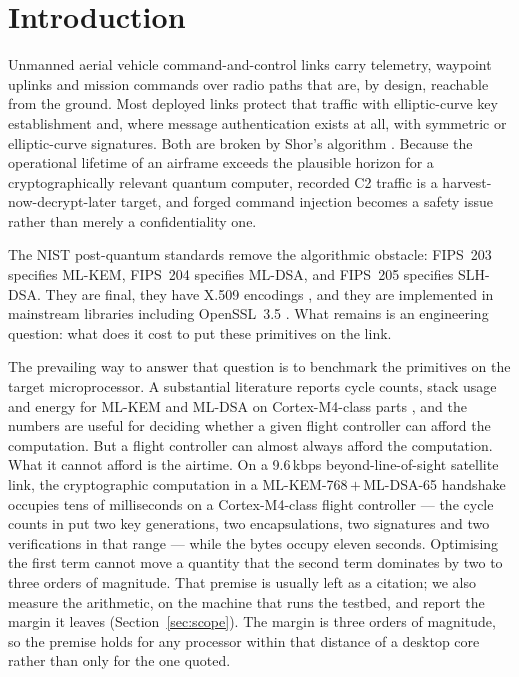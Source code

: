 \documentclass[drones,article,submit,pdftex,moreauthors]{Definitions/mdpi}
\newcommand{\kbps}{kbps}
\newcommand{\mlkem}{ML-KEM}
\newcommand{\mldsa}{ML-DSA}
\newcommand{\slhdsa}{SLH-DSA}
\begin{document}
\section{Introduction}

Unmanned aerial vehicle command-and-control links carry telemetry,
waypoint uplinks and mission commands over radio paths that are, by
design, reachable from the ground. Most deployed links protect that
traffic with elliptic-curve key establishment and, where message
authentication exists at all, with symmetric or elliptic-curve
signatures. Both are broken by Shor's algorithm \cite{shor1997}. Because
the operational lifetime of an airframe exceeds the plausible horizon
for a cryptographically relevant quantum computer, recorded C2 traffic
is a harvest-now-decrypt-later target, and forged command injection
becomes a safety issue rather than merely a confidentiality one.

The NIST post-quantum standards remove the algorithmic obstacle:
FIPS~203 \cite{fips203} specifies \mlkem{}, FIPS~204 \cite{fips204}
specifies \mldsa{}, and FIPS~205 \cite{fips205} specifies \slhdsa{}.
They are final, they have X.509 encodings \cite{rfc9881,rfc9909}, and
they are implemented in mainstream libraries including OpenSSL~3.5
\cite{openssl35}. What remains is an engineering question: what does it
cost to put these primitives on the link.

The prevailing way to answer that question is to benchmark the
primitives on the target microprocessor. A substantial literature
reports cycle counts, stack usage and energy for \mlkem{} and \mldsa{}
on Cortex-M4-class parts \cite{pqm4,botros2019}, and the numbers are
useful for deciding whether a given flight controller can afford the
computation. But a flight controller can almost always afford the
computation. What it cannot afford is the airtime. On a 9.6\,\kbps{}
beyond-line-of-sight satellite link, the cryptographic computation in a
\mlkem{}-768\,$+$\,\mldsa{}-65 handshake occupies tens of milliseconds
on a Cortex-M4-class flight controller --- the cycle counts in
\cite{pqm4,botros2019} put two key generations, two encapsulations, two
signatures and two verifications in that range --- while the bytes
occupy eleven seconds. Optimising the first term cannot move a quantity
that the second term dominates by two to three orders of magnitude. That
premise is usually left as a citation; we also measure the arithmetic,
on the machine that runs the testbed, and report the margin it leaves
(Section~\ref{sec:scope}). The margin is three orders of magnitude, so
the premise holds for any processor within that distance of a desktop
core rather than only for the one quoted.
\end{document}
